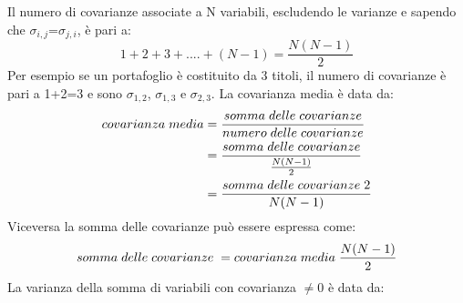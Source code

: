 Il numero di covarianze associate a N variabili, escludendo le varianze e sapendo che   
$\sigma_{i,j}$=$\sigma_{j,i}$, è pari a:
\begin{equation}
1+2+3+....+(N-1)= \dfrac{N(N-1)}{2}
\nonumber
\end{equation}
Per esempio se un portafoglio è costituito da 3 titoli, il numero di covarianze è pari a 1+2=3 e sono $\sigma_{1,2}$, $\sigma_{1,3}$ e $\sigma_{2,3}$. La covarianza media è data da:
\begin{equation}
\begin{split}
covarianza\hspace{0,1cm}media & = \frac{somma \hspace{0,1cm} delle \hspace{0,1cm} covarianze}{numero\hspace{0,1cm} delle \hspace{0,1cm}covarianze} \\
&=\dfrac{somma\hspace{0,1cm} delle \hspace{0,1cm}covarianze}{\frac{N(N-1)}{2}}\\
&=\dfrac{somma\hspace{0,1cm} delle\hspace{0,1cm} covarianze\hspace{0,1cm}  2}{N(N-1)}
\end{split}
\end{equation}
Viceversa la somma delle covarianze può essere espressa come: 
\begin{equation}
somma\hspace{0,1cm} delle\hspace{0,1cm} covarianze\hspace{0,1cm} = covarianza\hspace{0,1cm} media\hspace{0,1cm} \frac{N(N-1)}{2}
\end{equation}
La varianza della somma di variabili con covarianza $\neq 0$ è data da:

